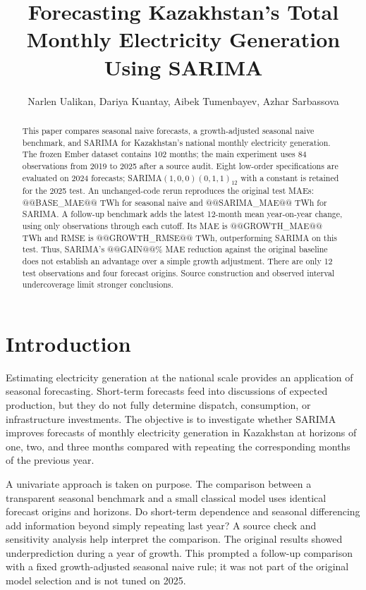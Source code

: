 \documentclass[11pt,a4paper,twoside,reqno]{amsart}
\title[Monthly electricity generation in Kazakhstan]{Forecasting Kazakhstan's Total Monthly Electricity Generation Using SARIMA}
\author[Ualikan, Kuantay, Tumenbayev and Sarbassova]{Narlen Ualikan, Dariya Kuantay, Aibek Tumenbayev, Azhar Sarbassova}
\date{}
\numberwithin{equation}{section}
\begin{document}
\begin{abstract}
This paper compares seasonal naive forecasts, a growth-adjusted seasonal naive benchmark, and SARIMA for Kazakhstan's national monthly electricity generation. The frozen Ember dataset contains 102 months; the main experiment uses 84 observations from 2019 to 2025 after a source audit. Eight low-order specifications are evaluated on 2024 forecasts; SARIMA$(1,0,0)(0,1,1)_{12}$ with a constant is retained for the 2025 test. An unchanged-code rerun reproduces the original test MAEs: @@BASE_MAE@@ TWh for seasonal naive and @@SARIMA_MAE@@ TWh for SARIMA. A follow-up benchmark adds the latest 12-month mean year-on-year change, using only observations through each cutoff. Its MAE is @@GROWTH_MAE@@ TWh and RMSE is @@GROWTH_RMSE@@ TWh, outperforming SARIMA on this test. Thus, SARIMA's @@GAIN@@\% MAE reduction against the original baseline does not establish an advantage over a simple growth adjustment. There are only 12 test observations and four forecast origins. Source construction and observed interval undercoverage limit stronger conclusions.
\end{abstract}
\maketitle
\section{Introduction}

Estimating electricity generation at the national scale provides an application of seasonal forecasting. Short-term forecasts feed into discussions of expected production, but they do not fully determine dispatch, consumption, or infrastructure investments. The objective is to investigate whether SARIMA improves forecasts of monthly electricity generation in Kazakhstan at horizons of one, two, and three months compared with repeating the corresponding months of the previous year.\par

A univariate approach is taken on purpose. The comparison between a transparent seasonal benchmark and a small classical model uses identical forecast origins and horizons. Do short-term dependence and seasonal differencing add information beyond simply repeating last year? A source check and sensitivity analysis help interpret the comparison. The original results showed underprediction during a year of growth. This prompted a follow-up comparison with a fixed growth-adjusted seasonal naive rule; it was not part of the original model selection and is not tuned on 2025.\par
\end{document}
